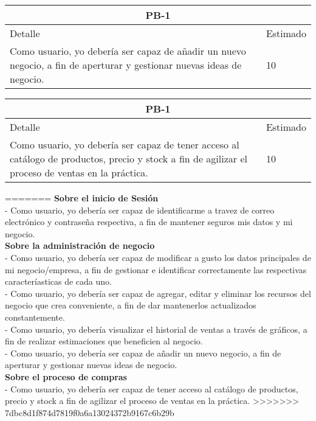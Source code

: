 \begin{table}[htbp]
	\begin{center}
		\begin{tabular}{| p{12cm} | p{2cm} |}
			\hline
			\multicolumn{2}{|c|}{PB-1}\\
			\hline
			Detalle & Estimado \\
			\hline
			Como usuario, yo debería ser capaz de añadir un nuevo negocio, a fin de aperturar y gestionar nuevas ideas de negocio.& 10 \\
			\hline	
		\end{tabular}
	\end{center}
\end{table}
\begin{table}[htbp]
	\begin{center}
		\begin{tabular}{| p{12cm} | p{2cm} |}
			\hline
			\multicolumn{2}{|c|}{PB-1}\\
			\hline
			Detalle & Estimado \\
			\hline
			Como usuario, yo debería ser capaz de tener acceso al catálogo de productos, precio y stock a fin de agilizar el proceso de ventas en la práctica.& 10 \\
			\hline	
		\end{tabular}
	\end{center}
\end{table}


=======
\setlength{\parindent}{0pt}
\textbf{Sobre el inicio de Sesión}\\
- Como usuario, yo debería ser capaz de identificarme a travez de correo electrónico y contraseña respectiva, a fin de mantener seguros mis datos y mi negocio.\\
\textbf{Sobre la administración de negocio}\\
- Como usuario, yo debería ser capaz de modificar a gusto los datos principales de mi negocio/empresa, a fin de gestionar e identificar correctamente las respectivas caracteríasticas de cada uno.\\
- Como usuario, yo debería ser capaz de agregar, editar y eliminar los recursos del negocio que crea conveniente, a fin de dar mantenerlos actualizados constantemente.\\
- Como usuario, yo debería visualizar el historial de ventas a través de gráficos, a fin de realizar estimaciones que beneficien al negocio.\\
- Como usuario, yo debería ser capaz de añadir un nuevo negocio, a fin de aperturar y gestionar nuevas ideas de negocio.\\
\textbf{Sobre el proceso de compras}\\
- Como usuario, yo debería ser capaz de tener acceso al catálogo de productos, precio y stock a fin de agilizar el proceso de ventas en la práctica. 
>>>>>>> 7dbc8d1f874d7819f0a6a13024372b9167c6b29b
